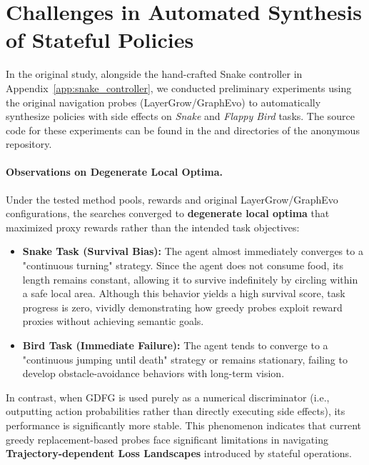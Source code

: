 
\section{Challenges in Automated Synthesis of Stateful Policies}
\label{app:side_effect_experiments}

In the original study, alongside the hand-crafted Snake controller in Appendix~\ref{app:snake_controller}, we conducted preliminary experiments using the original navigation probes (LayerGrow/GraphEvo) to automatically synthesize policies with side effects on \textit{Snake} and \textit{Flappy Bird} tasks. The source code for these experiments can be found in the  and  directories of the anonymous repository.

\paragraph{Observations on Degenerate Local Optima.}
Under the tested method pools, rewards and original LayerGrow/GraphEvo configurations, the searches converged to \textbf{degenerate local optima} that maximized proxy rewards rather than the intended task objectives:
\begin{itemize}
    \item \textbf{Snake Task (Survival Bias):} The agent almost immediately converges to a "continuous turning" strategy. Since the agent does not consume food, its length remains constant, allowing it to survive indefinitely by circling within a safe local area. Although this behavior yields a high survival score, task progress is zero, vividly demonstrating how greedy probes exploit reward proxies without achieving semantic goals.
    \item \textbf{Bird Task (Immediate Failure):} The agent tends to converge to a "continuous jumping until death" strategy or remains stationary, failing to develop obstacle-avoidance behaviors with long-term vision.
\end{itemize}
In contrast, when GDFG is used purely as a numerical discriminator (i.e., outputting action probabilities rather than directly executing side effects), its performance is significantly more stable. This phenomenon indicates that current greedy replacement-based probes face significant limitations in navigating \textbf{Trajectory-dependent Loss Landscapes} introduced by stateful operations.


